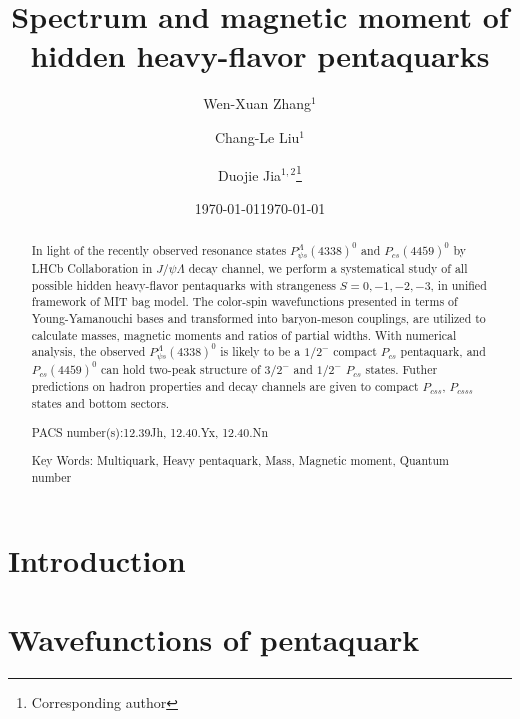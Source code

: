 \documentclass[prd,twocolumn,floatfix,nofootinbib]{revtex4}
\begin{document}
\title{Spectrum and magnetic moment of hidden heavy-flavor pentaquarks}
\author{Wen-Xuan Zhang$^{1}$}
\author{Chang-Le Liu$^{1}$}
\author{Duojie Jia$^{1,2}$\thanks{%
Corresponding author}}
\date{\today}

\begin{abstract}
In light of the recently observed resonance states $P_{\psi s}^{\Lambda}(4338)^0$ and $P_{cs}(4459)^0$ by LHCb Collaboration
in $J/\psi\Lambda$ decay channel, we perform a systematical study of all possible hidden heavy-flavor pentaquarks with strangeness $S=0,-1,-2,-3$, 
in unified framework of MIT bag model. The color-spin wavefunctions presented in terms of Young-Yamanouchi bases and transformed into baryon-meson couplings, 
are utilized to calculate masses, magnetic moments and ratios of partial widths. With numerical analysis, the observed $P_{\psi s}^{\Lambda}(4338)^0$ is likely 
to be a $1/2^-$ compact $P_{cs}$ pentaquark, and $P_{cs}(4459)^0$ can hold two-peak structure of $3/2^-$ and $1/2^-$ $P_{cs}$ states. Futher predictions
on hadron properties and decay channels are given to compact $P_{css}$, $P_{csss}$ states and bottom sectors.

PACS number(s):12.39Jh, 12.40.Yx, 12.40.Nn

Key Words: Multiquark, Heavy pentaquark, Mass, Magnetic moment, Quantum number
\end{abstract}

\maketitle
\date{\today}


\maketitle\section{Introduction}



\section{Wavefunctions of pentaquark}\label{sec:CMI}
\end{document}
